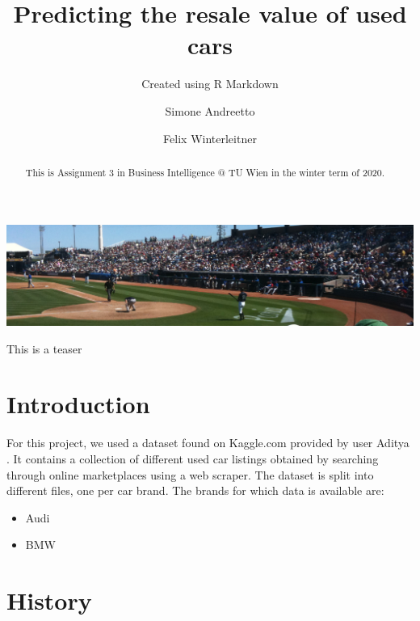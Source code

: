 \documentclass[sigchi]{acmart}
\def\tightlist{}
\begin{document}
\title{Predicting the resale value of used cars}
\subtitle{Created using R Markdown}

\author{Simone Andreetto}

\author{Felix Winterleitner}

\renewcommand{\shortauthors}{S. Andreetto et al.}


\begin{abstract}
This is Assignment 3 in Business Intelligence @ TU Wien in the winter term of 2020.
\end{abstract}



\begin{teaserfigure}
  \includegraphics[width=\textwidth]{sampleteaser}
  \caption{This is a teaser}
  \label{fig:teaser}
\end{teaserfigure}


\maketitle

\hypertarget{introduction}{%
\section{Introduction}\label{introduction}}

For this project, we used a dataset found on Kaggle.com provided by user Aditya \citep{Aditya}. It contains a collection of different used car listings obtained by searching through online marketplaces using a web scraper. The dataset is split into different files, one per car brand. The brands for which data is available are:

\begin{itemize}
\tightlist
\item
  Audi
\item
  BMW
\end{itemize}

\hypertarget{history}{%
\section{History}\label{history}}
\end{document}
